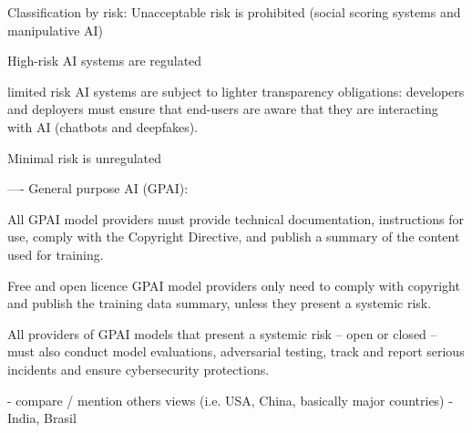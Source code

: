 Classification by risk:
Unacceptable risk is prohibited (social scoring systems and manipulative AI)

High-risk AI systems are regulated

limited risk AI systems are subject to lighter transparency obligations: developers and deployers must ensure that end-users are aware that they are interacting with AI (chatbots and deepfakes).

Minimal risk is unregulated

----
General purpose AI (GPAI):

All GPAI model providers must provide technical documentation, instructions for use, comply with the Copyright Directive, and publish a summary of the content used for training.

Free and open licence GPAI model providers only need to comply with copyright and publish the training data summary, unless they present a systemic risk.

All providers of GPAI models that present a systemic risk – open or closed – must also conduct model evaluations, adversarial testing, track and report serious incidents and ensure cybersecurity protections.

- compare / mention others views (i.e. USA, China, basically major countries)
- India, Brasil






